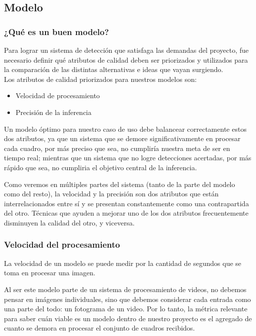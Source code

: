 \documentclass[a4paper]{article}
\begin{document}
\subsection{Modelo}

\subsubsection{¿Qué es un buen modelo?}

Para lograr un sistema de detección que satisfaga las demandas del proyecto, fue necesario definir qué atributos de calidad deben ser priorizados y utilizados para la comparación de las distintas alternativas e ideas que vayan surgiendo.\\

Los atributos de calidad priorizados para nuestros modelos son:

\begin{itemize}
\itemsep0em
    \item Velocidad de procesamiento
    \item Precisión de la inferencia
\end{itemize}

Un modelo óptimo para nuestro caso de uso debe balancear correctamente estos dos atributos, ya que un sistema que se demore significativamente en procesar cada cuadro, por más preciso que sea, no cumpliría nuestra meta de ser en tiempo real; mientras que un sistema que no logre detecciones acertadas, por más rápido que sea, no cumpliria el objetivo central de la inferencia.

Como veremos en múltiples partes del sistema (tanto de la parte del modelo como del resto), la velocidad y la precisión son dos atributos que están interrelacionados entre sí y se presentan constantemente como una contrapartida del otro. Técnicas que ayuden a mejorar uno de los dos atributos frecuentemente disminuyen la calidad del otro, y viceversa.

\subsubsection{Velocidad del procesamiento}

La velocidad de un modelo se puede medir por la cantidad de segundos que se toma en procesar una imagen.

Al ser este modelo parte de un sistema de procesamiento de videos, no debemos pensar en imágenes individuales, sino que debemos considerar cada entrada como una parte del todo: un fotograma de un video. Por lo tanto, la métrica relevante para saber cuán viable es un modelo dentro de nuestro proyecto es el agregado de cuanto se demora en procesar el conjunto de cuadros recibidos.
\end{document}
